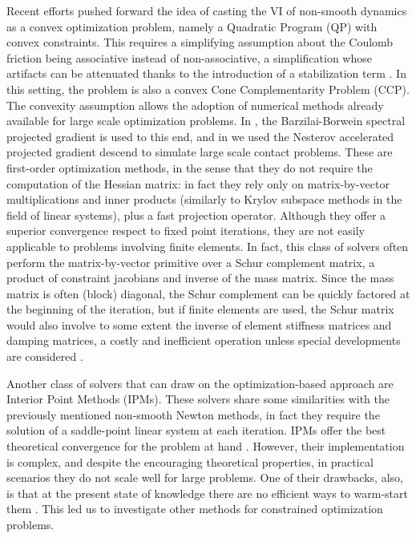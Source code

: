 \documentclass[AMA,STIX1COL]{WileyNJD-v2}
\begin{document}
Recent efforts pushed forward the idea of casting the VI of non-smooth dynamics as a convex optimization problem, namely a Quadratic Program (QP) with convex constraints. This requires a simplifying assumption about the Coulomb friction being associative instead of non-associative, a simplification whose artifacts can be attenuated thanks to the introduction of a stabilization term \cite{ani04}. In this setting, the problem is also a convex Cone Complementarity Problem (CCP). The convexity assumption allows the adoption of numerical methods already available for large scale optimization problems. In \cite{heynIJNME2013}, the Barzilai-Borwein spectral projected gradient is used to this end, and in \cite{hammadTOG2015} we used the Nesterov accelerated projected gradient descend to simulate large scale contact problems.
These are first-order optimization methods, in the sense that they do not require the computation of the Hessian matrix: in fact they rely only on  matrix-by-vector multiplications and inner products (similarly to Krylov subspace methods in the field of linear systems), plus a fast projection operator. Although they offer a superior convergence respect to fixed point iterations, they are not easily applicable to problems involving finite elements. In fact, this class of solvers often perform the matrix-by-vector primitive over a Schur complement matrix, a product of constraint jacobians and inverse of the mass matrix. Since the mass matrix is often (block) diagonal, the Schur complement can be quickly factored at the beginning of the iteration, but if finite elements are used, the Schur matrix would also involve to some extent the inverse of element stiffness matrices and damping matrices, a costly and inefficient operation unless special developments are considered \cite{Francu2017}.

Another class of solvers that can draw on the optimization-based approach are Interior Point Methods (IPMs). These solvers share some similarities with the previously mentioned non-smooth Newton methods, in fact they require the solution of a saddle-point linear system at each iteration. IPMs offer the best theoretical convergence for the problem at hand \cite{Potra2000}. However, their implementation is complex, and despite the encouraging theoretical properties, in practical scenarios they do not scale well for large problems. One of their drawbacks, also, is that at the present state of knowledge there are no efficient ways to warm-start them \cite{Mangoni2018}. This led us to investigate other methods for constrained optimization problems.
\end{document}
